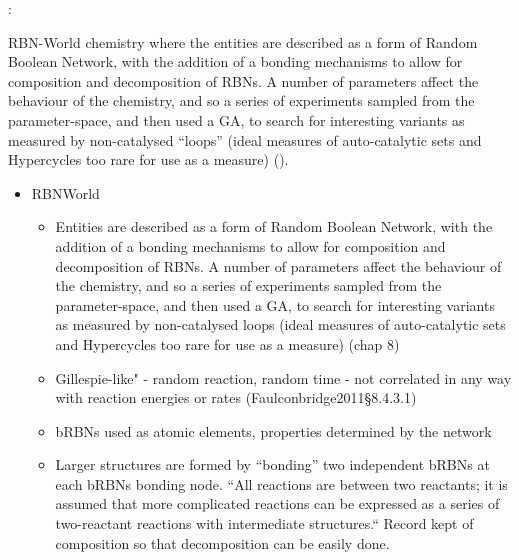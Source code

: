 		\autocite{Faulconbridge2010, Faulconbridge2011}:
		
		RBN-World \cite{Faulconbridge2011} chemistry where the entities are described as a form of Random Boolean Network, with the addition of a bonding mechanisms to allow for composition and decomposition of RBNs. A number of parameters affect the behaviour of the chemistry, and so a series of experiments sampled from the parameter-space, and then used a GA, to search for interesting variants as measured by non-catalysed ``loops'' (ideal measures of auto-catalytic sets and Hypercycles too rare for use as a measure) (\cite[§8]{Faulconbridge2011}). 
		
		\begin{itemize}

			\item
			
			RBNWorld	
			
			\begin{itemize}
				\item
				
				Entities are described as a form of Random Boolean Network, with the
				addition of a bonding mechanisms to allow for composition and
				decomposition of RBNs. A number of parameters affect the behaviour
				of the chemistry, and so a series of experiments sampled from the
				parameter-space, and then used a GA, to search for interesting
				variants as measured by non-catalysed loops (ideal measures of
				auto-catalytic sets and Hypercycles too rare for use as a measure)
				(chap 8)
				
				\item
				
				Gillespie-like" - random reaction, random time - not correlated in
				any way with reaction energies or rates (Faulconbridge2011§8.4.3.1)
				
				\item
				
				bRBNs used as atomic elements, properties determined by the network
				
				\item
				
				Larger structures are formed by ``bonding'' two independent bRBNs at
				each bRBNs bonding node. ``All reactions are between two reactants;
				it is assumed that more complicated reactions can be expressed as a
				series of two-reactant reactions with intermediate structures.``
				Record kept of composition so that decomposition can be easily done.
				

\end{itemize}
\end{itemize}
